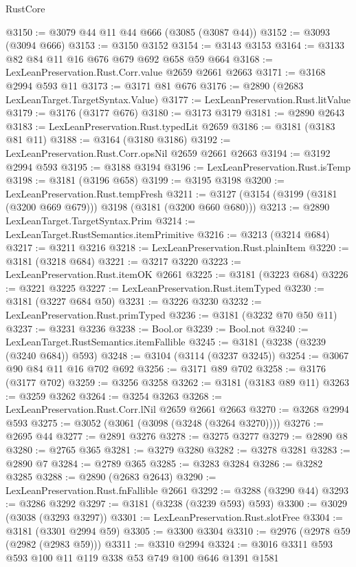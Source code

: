 \begin{lexlean}{RustCore}
\begin{coremodule}
@3150 := @3079 @44 @11 @44 @666 (@3085 (@3087 @44))
@3152 := @3093 (@3094 @666)
@3153 := @3150 @3152
@3154 := @3143 @3153
@3164 := @3133 @82 @84 @11 @16 @676 @679 @692 @658 @59 @664
@3168 := LexLeanPreservation.Rust.Corr.value @2659 @2661 @2663
@3171 := @3168 @2994 @593 @11
@3173 := @3171 @81 @676
@3176 := @2890 (@2683 LexLeanTarget.TargetSyntax.Value)
@3177 := LexLeanPreservation.Rust.litValue
@3179 := @3176 (@3177 @676)
@3180 := @3173 @3179
@3181 := @2890 @2643
@3183 := LexLeanPreservation.Rust.typedLit @2659
@3186 := @3181 (@3183 @81 @11)
@3188 := @3164 (@3180 @3186)
@3192 := LexLeanPreservation.Rust.Corr.opsNil @2659 @2661 @2663
@3194 := @3192 @2994 @593
@3195 := @3188 @3194
@3196 := LexLeanPreservation.Rust.isTemp
@3198 := @3181 (@3196 @658)
@3199 := @3195 @3198
@3200 := LexLeanPreservation.Rust.tempFresh
@3211 := @3127 (@3154 (@3199 (@3181 (@3200 @669 @679))) @3198 (@3181 (@3200 @660 @680)))
@3213 := @2890 LexLeanTarget.TargetSyntax.Prim
@3214 := LexLeanTarget.RustSemantics.itemPrimitive
@3216 := @3213 (@3214 @684)
@3217 := @3211 @3216
@3218 := LexLeanPreservation.Rust.plainItem
@3220 := @3181 (@3218 @684)
@3221 := @3217 @3220
@3223 := LexLeanPreservation.Rust.itemOK @2661
@3225 := @3181 (@3223 @684)
@3226 := @3221 @3225
@3227 := LexLeanPreservation.Rust.itemTyped
@3230 := @3181 (@3227 @684 @50)
@3231 := @3226 @3230
@3232 := LexLeanPreservation.Rust.primTyped
@3236 := @3181 (@3232 @70 @50 @11)
@3237 := @3231 @3236
@3238 := Bool.or
@3239 := Bool.not
@3240 := LexLeanTarget.RustSemantics.itemFallible
@3245 := @3181 (@3238 (@3239 (@3240 @684)) @593)
@3248 := @3104 (@3114 (@3237 @3245))
@3254 := @3067 @90 @84 @11 @16 @702 @692
@3256 := @3171 @89 @702
@3258 := @3176 (@3177 @702)
@3259 := @3256 @3258
@3262 := @3181 (@3183 @89 @11)
@3263 := @3259 @3262
@3264 := @3254 @3263
@3268 := LexLeanPreservation.Rust.Corr.lNil @2659 @2661 @2663
@3270 := @3268 @2994 @593
@3275 := @3052 (@3061 (@3098 (@3248 (@3264 @3270))))
@3276 := @2695 @44
@3277 := @2891 @3276
@3278 := @3275 @3277
@3279 := @2890 @8
@3280 := @2765 @365
@3281 := @3279 @3280
@3282 := @3278 @3281
@3283 := @2890 @7
@3284 := @2789 @365
@3285 := @3283 @3284
@3286 := @3282 @3285
@3288 := @2890 (@2683 @2643)
@3290 := LexLeanPreservation.Rust.fnFallible @2661
@3292 := @3288 (@3290 @44)
@3293 := @3286 @3292
@3297 := @3181 (@3238 (@3239 @593) @593)
@3300 := @3029 (@3038 (@3293 @3297))
@3301 := LexLeanPreservation.Rust.slotFree
@3304 := @3181 (@3301 @2994 @59)
@3305 := @3300 @3304
@3310 := @2976 (@2978 @59 (@2982 (@2983 @59)))
@3311 := @3310 @2994
@3324 := @3016 @3311 @593 @593 @100 @11 @119 @338 @53 @749 @100 @646 @1391 @1581

\end{coremodule}
\end{lexlean}
